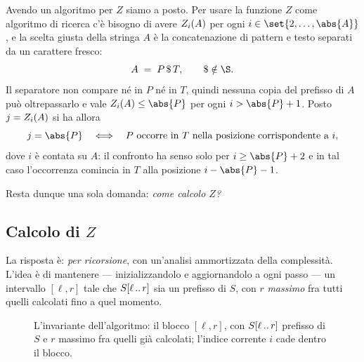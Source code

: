 Avendo un algoritmo per $Z$ siamo a posto. Per usare la funzione $Z$ come
algoritmo di ricerca c'è bisogno di avere $Z_{i}(A)$ per ogni
$i\in\set{2,\dots,\abs{A}}$, e la scelta giusta della stringa $A$ è la
concatenazione di pattern e testo separati da un carattere fresco:
\[
  A \;=\; P\,\$\,T, \qquad \$ \notin \alfa .
\]
Il separatore non compare né in $P$ né in $T$, quindi nessuna copia del prefisso
di $A$ può oltrepassarlo e vale $\Zv{i}(A)\le\abs{P}$ per ogni $i>\abs{P}+1$.
Posto $j=Z_{i}(A)$ si ha allora
\[
  j = \abs{P}
  \quad\Longleftrightarrow\quad
  P \ \text{occorre in } T \text{ nella posizione corrispondente a } i ,
\]
dove $i$ è contata su $A$: il confronto ha senso solo per $i \ge \abs{P}+2$ e in
tal caso l'occorrenza comincia in $T$ alla posizione $i-\abs{P}-1$.

Resta dunque una sola domanda: \emph{come calcolo $Z$?}

\subsection{Calcolo di \texorpdfstring{$Z$}{Z}}
\label{sec:z-calcolo}

La risposta è: \emph{per ricorsione}, con un'analisi ammortizzata della
complessità. L'idea è di mantenere --- inizializzandolo e aggiornandolo a ogni
passo --- un intervallo $[\ell,r]$ tale che $S[\ell\,..\,r]$ sia un prefisso di
$S$, con $r$ \emph{massimo} fra tutti quelli calcolati fino a quel momento.

\begin{figure}[H]
  \centering
  
  \caption{L'invariante dell'algoritmo: il blocco $[\ell,r]$, con
  $S[\ell\,..\,r]$ prefisso di $S$ e $r$ massimo fra quelli già calcolati;
  l'indice corrente $i$ cade dentro il blocco.}
  \label{fig:z-blocco-lr}
\end{figure}

